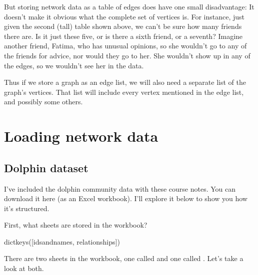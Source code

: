 \documentclass[letterpaper,10pt,english]{sphinxmanual}
\begin{document}
But storing network data as a table of edges does have one small disadvantage:  It doesn’t make it obvious what the complete set of vertices is.  For instance, just given the second (tall) table shown above, we can’t be sure how many friends there are.  Is it just these five, or is there a sixth friend, or a seventh?  Imagine another friend, Fatima, who has unusual opinions, so she wouldn’t go to any of the friends for advice, nor would they go to her.  She wouldn’t show up in any of the edges, so we wouldn’t see her in the data.

Thus if we store a graph as an edge list, we will also need a separate list of the graph’s vertices.  That list will include every vertex mentioned in the edge list, and possibly some others.


\section{Loading network data}
\label{\detokenize{chapter-15-networks:loading-network-data}}

\subsection{Dolphin dataset}
\label{\detokenize{chapter-15-networks:dolphin-dataset}}
I’ve included the dolphin community data with these course notes.  You can download it here (as an Excel workbook).  I’ll explore it below to show you how it’s structured.

First, what sheets are stored in the workbook?

\begin{sphinxVerbatim}[commandchars=\\\{\}]
   
     
\end{sphinxVerbatim}

\begin{sphinxVerbatim}[commandchars=\\\{\}]
dict\PYGZus{}keys([\PYGZsq{}ids\PYGZus{}and\PYGZus{}names\PYGZsq{}, \PYGZsq{}relationships\PYGZsq{}])
\end{sphinxVerbatim}

There are two sheets in the workbook, one called  and one called .  Let’s take a look at both.
\end{document}
